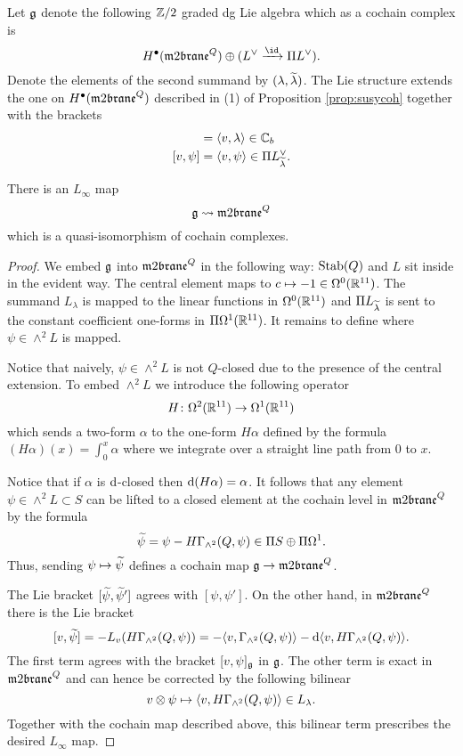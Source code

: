 \begin{lem}
\label{lem:gmodel}
Let $\fg$ denote the following $\ZZ/2$ graded dg Lie algebra which as a cochain complex is
\[
H^\bu(\m2^Q) \oplus (L^\vee \xto{\id} \Pi L^\vee)  .
\]
Denote the elements of the second summand by $(\lambda, \til\lambda)$. 
The Lie structure extends the one on $H^\bu(\m2^Q)$ described in (1) of Proposition \ref{prop:susycoh} together with the brackets
\begin{align*}
[v,\lambda] & = \<v, \lambda\> \in \CC_b \\ 
[v,\psi] & = \<v, \psi\> \in \Pi L^\vee_{\Tilde{\lambda}}.
\end{align*}

There is an $L_\infty$ map 
\[
\fg \rightsquigarrow \m2^Q
\] 
which is a quasi-isomorphism of cochain complexes.  
\end{lem}
\begin{proof}
We embed $\fg$ into $\m2^Q$ in the following way: ${\rm Stab}(Q)$ and $L$ sit inside in the evident way.
The central element maps to $c \mapsto - 1 \in \Omega^0(\RR^{11})$.
The summand $L_\lambda$ is mapped to the linear functions in $\Omega^0(\RR^{11})$ and $\Pi L_{\Tilde{\lambda}}$ is sent to the constant coefficient one-forms in $\Pi \Omega^1(\RR^{11})$. 
It remains to define where $\psi \in \wedge^2 L$ is mapped.

Notice that naively, $\psi \in \wedge^2 L$ is not $Q$-closed due to the presence of the central extension. 
To embed $\wedge^2 L$ we introduce the following operator
\[
H \colon \Omega^2 (\RR^{11}) \to \Omega^1(\RR^{11})
\]
which sends a two-form $\alpha$ to the one-form $H \alpha$ defined by the formula $(H \alpha) (x) = \int_0^x \alpha$
where we integrate over a straight line path from $0$ to $x$.

Notice that if $\alpha$ is $\d$-closed then $\d (H \alpha) = \alpha$. 
It follows that any element $\psi \in \wedge^2 L \subset S$ can be lifted to a closed element at the cochain level in $\m2^Q$ by the formula
\[
\Tilde{\psi} = \psi - H \Gamma_{\wedge^2} (Q, \psi) \in \Pi S \oplus \Pi \Omega^1 .
\]
Thus, sending $\psi \mapsto \Tilde{\psi}$ defines a cochain map $\fg \to \m2^Q$. 

The Lie bracket $[\Tilde{\psi}, \Tilde{\psi}']$ agrees with $[\psi, \psi']$. 
On the other hand, in $\m2^Q$ there is the Lie bracket 
\[
[v,\Tilde{\psi}] = - L_v (H \Gamma_{\wedge^2} (Q, \psi)) = -\<v, \Gamma_{\wedge^2}(Q, \psi)\> - \d \<v, H \Gamma_{\wedge^2}(Q, \psi)\> .
\]
The first term agrees with the bracket $[v, \psi]_{\fg}$ in $\fg$. 
The other term is exact in $\m2^Q$ and can hence be corrected by the following bilinear  
\[
v \otimes \psi \mapsto \<v, H \Gamma_{\wedge^2} (Q,\psi) \> \in L_\lambda .
\] 
Together with the cochain map described above, this bilinear term prescribes the desired $L_\infty$ map. 

\end{proof}

